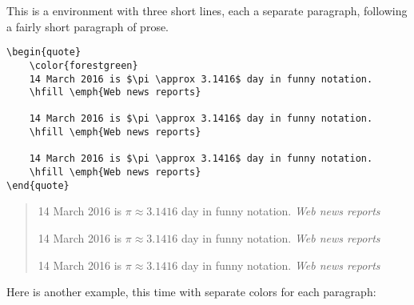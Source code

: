 This is a  environment
with three short lines, each a separate paragraph,
following a fairly short paragraph of prose.

\begin{singlespace}
\color{darkblue}
\begin{verbatim}
\begin{quote}
    \color{forestgreen}
    14 March 2016 is $\pi \approx 3.1416$ day in funny notation.
    \hfill \emph{Web news reports}

    14 March 2016 is $\pi \approx 3.1416$ day in funny notation.
    \hfill \emph{Web news reports}

    14 March 2016 is $\pi \approx 3.1416$ day in funny notation.
    \hfill \emph{Web news reports}
\end{quote}
\end{verbatim}
\end{singlespace}
%
\begin{quote}
    \color{forestgreen}
    14 March 2016 is $\pi \approx 3.1416$ day in funny notation.
    \hfill \emph{Web news reports}

    14 March 2016 is $\pi \approx 3.1416$ day in funny notation.
    \hfill \emph{Web news reports}

    14 March 2016 is $\pi \approx 3.1416$ day in funny notation.
    \hfill \emph{Web news reports}
\end{quote}

Here is another example, this time with separate
colors for each paragraph:

